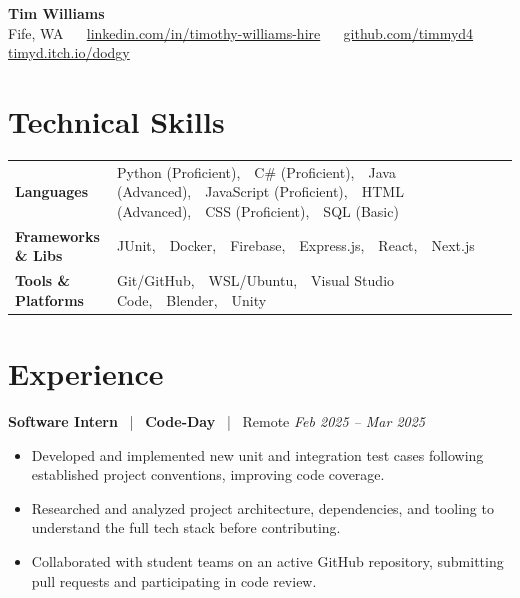 \documentclass[10pt, letterpaper]{article}
\newcommand{\jobhead}[4]{%
  \vspace{5pt}%
  {\bfseries\color{dark}#1}%
  ~{\color{light}|}~%
  {\bfseries\color{navy}#2}%
  ~{\color{light}|}~%
  {\color{light}#3}%
  \hfill{\color{light}\small\textit{#4}}\\[-2pt]%
}
\newcommand{\skillrow}[2]{%
  {\bfseries #1} & #2 \\[2pt]%
}
\begin{document}

\begin{center}
  {\huge\bfseries\color{navy} Tim Williams}\\[4pt]
  {\small\color{light}
    Fife, WA
    ~\textbullet~
    \href{https://linkedin.com/in/timothy-williams-hire}{linkedin.com/in/timothy-williams-hire}
    ~\textbullet~
    \href{https://github.com/timmyd4}{github.com/timmyd4}
    ~\textbullet~
    \href{https://timyd.itch.io/dodgy}{timyd.itch.io/dodgy}
  }
\end{center}

\vspace{2pt}

\section{Technical Skills}

\begin{tabular}{@{}p{1.6in} p{5.2in}@{}}
  \skillrow{Languages}{Python (Proficient),\ \ C\# (Proficient),\ \ Java (Advanced),\ \ JavaScript (Proficient),\ \ HTML (Advanced),\ \ CSS (Proficient),\ \ SQL (Basic)}
  \skillrow{Frameworks \& Libs}{JUnit,\ \ Docker,\ \ Firebase,\ \ Express.js,\ \ React,\ \ Next.js}
  \skillrow{Tools \& Platforms}{Git/GitHub,\ \ WSL/Ubuntu,\ \ Visual Studio Code,\ \ Blender,\ \ Unity}
\end{tabular}

\section{Experience}

\jobhead{Software Intern}{Code-Day}{Remote}{Feb 2025 – Mar 2025}
\begin{itemize}
  \item Developed and implemented new unit and integration test cases following established project conventions, improving code coverage.
  \item Researched and analyzed project architecture, dependencies, and tooling to understand the full tech stack before contributing.
  \item Collaborated with student teams on an active GitHub repository, submitting pull requests and participating in code review.
\end{itemize}
\end{document}
